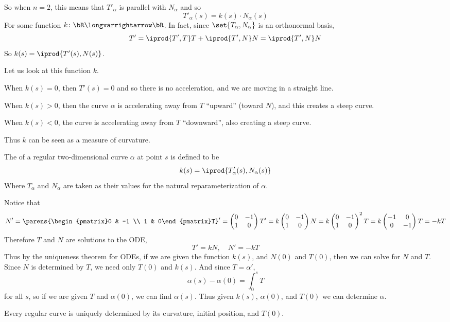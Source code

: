 \documentclass[10pt]{article}
\def\pmat#1{\begin{pmatrix} #1 \end{pmatrix}}
\def\pmat#1{\begin{pmatrix}#1\end{pmatrix}}
\let\longto=\longvarrightarrow
\begin{document}
So when $n=2$, this means that $T'_\alpha$ is parallel with $N_\alpha$ and so
\[ T'_\alpha(s) = k(s)\cdot N_\alpha(s) \]
For some function $k\colon\bR\longto\bR$.
In fact, since $\set{T_\alpha,N_\alpha}$ is an orthonormal basis,
\[ T' = \iprod{T',T}T + \iprod{T',N}N = \iprod{T',N}N \]
So $k(s)=\iprod{T'(s),N(s)}$.

Let us look at this function $k$.
\benum
    \item When $k(s)=0$, then $T'(s)=0$ and so there is no acceleration, and we are moving in a straight line.
    \item When $k(s)>0$, then the curve $\alpha$ is accelerating away from $T$ ``upward'' (toward $N$), and this creates a steep curve.
    \item When $k(s)<0$, the curve is accelerating away from $T$ ``downward'', also creating a steep curve.
\eenum

Thus $k$ can be seen as a measure of curvature.

\begin{defn*}

    The  of a regular two-dimensional curve $\alpha$ at point $s$ is defined to be
    \[ k(s) = \iprod{T'_\alpha(s), N_\alpha(s)} \]
    Where $T_\alpha$ and $N_\alpha$ are taken as their values for the natural reparameterization of $\alpha$.

\end{defn*}

Notice that
\[ N' = \parens{\pmat{0 & -1 \\ 1 & 0}T}' = \pmat{0 & -1 \\ 1 & 0}T' = k\pmat{0 & -1 \\ 1 & 0}N = k\pmat{0 & -1 \\ 1 & 0}^2T = k\pmat{-1 & 0 \\ 0 & -1}T = -kT \]
Therefore $T$ and $N$ are solutions to the ODE,
\[ T' = kN,\quad N'=-kT \]
Thus by the uniqueness theorem for ODEs, if we are given the function $k(s)$, and $N(0)$ and $T(0)$, then we can solve for $N$ and $T$.
Since $N$ is determined by $T$, we need only $T(0)$ and $k(s)$.
And since $T=\alpha'$,
\[ \alpha(s) - \alpha(0) = \int_0^s T \]
for all $s$, so if we are given $T$ and $\alpha(0)$, we can find $\alpha(s)$.
Thus given $k(s)$, $\alpha(0)$, and $T(0)$ we can determine $\alpha$.

\begin{thrm*}

    Every regular curve is uniquely determined by its curvature, initial position, and $T(0)$.

\end{thrm*}
\end{document}
